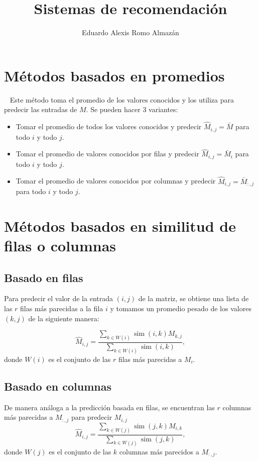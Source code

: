 \documentclass[spanish]{article}                 %
\title{Sistemas de recomendación}
\author{Eduardo Alexis Romo Almazán}
\numberwithin{equation}{section}                 %
\theoremstyle{definition}
\DeclareMathOperator{\Sim}{sim} %
\begin{document}
\maketitle

\section{Métodos basados en promedios}~\label{sec:basados_en_promedios}
Este método toma el promedio de los valores conocidos y los utiliza para predecir las entradas de $M$. Se pueden hacer 3 variantes:
\begin{itemize}
    \item Tomar el promedio de todos los valores conocidos y predecir $\hat M_{i, j} = \bar M$ para todo $i$ y todo $j$.
    \item Tomar el promedio de valores conocidos por filas y predecir $\hat M_{i, j} = \bar M_i$ para todo $i$ y todo $j$.
    \item Tomar el promedio de valores conocidos por columnas y predecir $\hat M_{i, j} = \bar M_{:,j}$ para todo $i$ y todo $j$.
\end{itemize}

\section{Métodos basados en similitud de filas o columnas}
\subsection{Basado en filas}
Para predecir el valor de la entrada $(i, j)$ de la matriz, se obtiene una lista de las $r$ filas más parecidas a la fila $i$ y tomamos un promedio pesado de los valores $(k, j)$ de la siguiente manera:

\begin{equation}
    \label{eq:row_based}
    \hat M_{i, j} = \frac{\sum_{k \in W(i)}\Sim(i, k) M_{k, j}}{\sum_{k \in W(i)} \Sim(i, k)},
\end{equation}
donde $W(i)$ es el conjunto de las $r$ filas más parecidas a $M_i$.

\subsection{Basado en columnas}

De manera análoga a la predicción basada en filas, se encuentran las $r$ columnas más parecidas a $M_{:,j}$ para predecir $M_{i, j}$
\begin{equation}
    \label{eq:col_based}
    \hat M_{i, j} = \frac{\sum_{k \in W(j)}\Sim(j, k) M_{i, k}}{\sum_{k \in W(j)} \Sim(j, k)},
\end{equation}
donde $W(j)$ es el conjunto de las $k$ columnas más parecidos a $M_{:,j}$.
\end{document}
